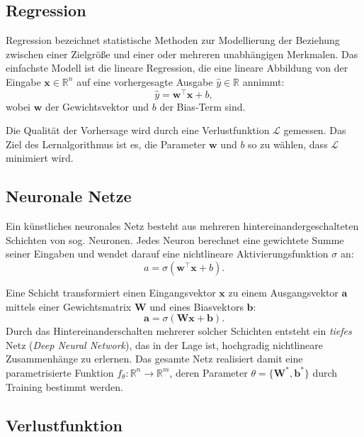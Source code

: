 \subsection{Regression}

Regression bezeichnet statistische Methoden zur Modellierung der Beziehung zwischen einer Zielgröße
und einer oder mehreren unabhängigen Merkmalen.
Das einfachste Modell ist die lineare Regression, die eine lineare Abbildung von der
Eingabe $\mathbf{x} \in \mathbb{R}^n$ auf eine vorhergesagte Ausgabe $\hat{y} \in \mathbb{R}$ annimmt:
\begin{equation}
    \hat{y} = \mathbf{w}^\top \mathbf{x} + b,
\end{equation}
wobei $\mathbf{w}$ der Gewichtsvektor und $b$ der Bias-Term sind.

Die Qualität der Vorhersage wird durch eine Verlustfunktion $\mathcal{L}$ gemessen.
Das Ziel des Lernalgorithmus ist es, die Parameter $\mathbf{w}$ und $b$ so zu wählen, dass
$\mathcal{L}$ minimiert wird.

\subsection{Neuronale Netze}

Ein künstliches neuronales Netz besteht aus mehreren hintereinandergeschalteten Schichten
von sog. Neuronen. Jedes Neuron berechnet eine gewichtete Summe seiner Eingaben und wendet
darauf eine nichtlineare Aktivierungsfunktion $\sigma$ an:
\begin{equation}
    a = \sigma\!\left(\mathbf{w}^\top \mathbf{x} + b\right).
\end{equation}

Eine Schicht transformiert einen Eingangsvektor $\mathbf{x}$ zu einem Ausgangsvektor $\mathbf{a}$
mittels einer Gewichtsmatrix $\mathbf{W}$ und eines Biasvektors $\mathbf{b}$:
\begin{equation}
    \mathbf{a} = \sigma\!\left(\mathbf{W}\mathbf{x} + \mathbf{b}\right).
\end{equation}
Durch das Hintereinanderschalten mehrerer solcher Schichten entsteht ein
\textit{tiefes} Netz (\textit{Deep Neural Network}), das in der Lage ist, hochgradig
nichtlineare Zusammenhänge zu erlernen.
Das gesamte Netz realisiert damit eine parametrisierte Funktion
$f_\theta : \mathbb{R}^n \to \mathbb{R}^m$, deren Parameter $\theta = \{\mathbf{W}^{*}, \mathbf{b}^{*}\}$
durch Training bestimmt werden.

\subsection{Verlustfunktion}

